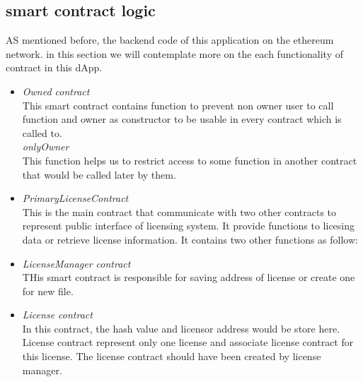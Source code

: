 \subsection{smart contract logic}
AS mentioned before, the backend code of this application on the ethereum network. in this section we will contemplate more on the each functionality of contract in this dApp.
\begin{itemize}
	\item \textit{Owned contract} \\
	This smart contract contains function to prevent non owner user to call function and owner as constructor to be usable in every contract which is called to. \\
	\textit{onlyOwner} \\
	This function helps us to restrict access to some function in another contract that would be called later by them. \\
	
	\item \textit{PrimaryLicenseContract} \\
	This is the main contract that communicate with two other contracts to represent public interface of licensing system.
	It provide functions to licesing data or retrieve license information. It contains two other functions as follow: \\
 	\item \textit{LicenseManager contract} \\
	THis smart contract is responsible for saving address of license or create one for new file.
	\item \textit{License contract} \\
	In this contract, the hash value and licensor address would be store here. License contract represent only one license and associate license contract for this license. The license contract should have been created by license manager.

\end{itemize}

